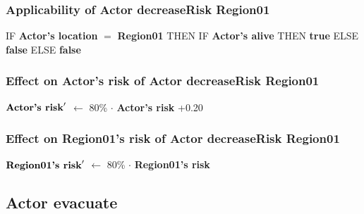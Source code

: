 \documentclass{article}%
\begin{document}
%
\subsubsection{Applicability of Actor decreaseRisk Region01}%
\label{ssubsec:Applicability of Actor decreaseRisk Region01}%
\begin{flushleft}%
IF %
\textbf{Actor's location}%
$=$%
\textbf{Region01}%
\linebreak%
\hspace*{2em}%
THEN %
IF %
\textbf{Actor's alive}%
\linebreak%
\hspace*{4em}%
THEN %
\textbf{true}%
\linebreak%
\hspace*{4em}%
ELSE %
\textbf{false}%
\linebreak%
\hspace*{2em}%
ELSE %
\textbf{false}%
\end{flushleft}

%
\subsubsection{Effect on Actor's risk of Actor decreaseRisk Region01}%
\label{ssubsec:Effect on Actor's risk of Actor decreaseRisk Region01}%
\begin{flushleft}%
$\mbox{\textbf{Actor's risk}} '$%
$\leftarrow$%
80\%%
$\cdot$%
\textbf{Actor's risk}%
+0.20%
\end{flushleft}

%
\subsubsection{Effect on Region01's risk of Actor decreaseRisk Region01}%
\label{ssubsec:Effect on Region01's risk of Actor decreaseRisk Region01}%
\begin{flushleft}%
$\mbox{\textbf{Region01's risk}} '$%
$\leftarrow$%
80\%%
$\cdot$%
\textbf{Region01's risk}%
\end{flushleft}

%
\subsection{Actor evacuate}%
\label{subsec:Actor evacuate}%
\end{document}
